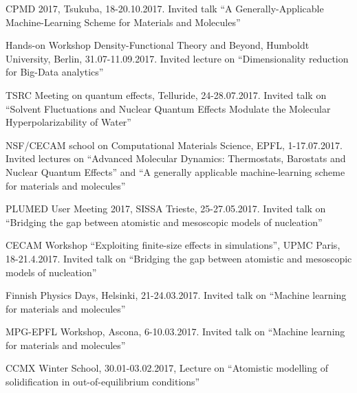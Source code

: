 \begin{enumerate}
{\item CPMD 2017, Tsukuba, 18-20.10.2017. Invited talk “A Generally-Applicable Machine-Learning Scheme for Materials and Molecules”
\item Hands-on Workshop Density-Functional Theory and Beyond, Humboldt University, Berlin, 31.07-11.09.2017. Invited lecture on “Dimensionality reduction for Big-Data analytics”
\item TSRC Meeting on quantum effects, Telluride, 24-28.07.2017. Invited talk on “Solvent Fluctuations and Nuclear Quantum Effects Modulate the Molecular Hyperpolarizability of Water”
\item NSF/CECAM school on Computational Materials Science, EPFL, 1-17.07.2017. Invited lectures on “Advanced Molecular Dynamics: Thermostats, Barostats and Nuclear Quantum Effects” and “A generally applicable machine-learning scheme for materials and molecules”
\item PLUMED User Meeting 2017, SISSA Trieste, 25-27.05.2017. Invited talk on “Bridging the gap between atomistic and mesoscopic models of nucleation”
\item CECAM Workshop “Exploiting finite-size effects in simulations”, UPMC Paris, 18-21.4.2017. Invited talk on “Bridging the gap between atomistic and mesoscopic models of nucleation”
\item Finnish Physics Days, Helsinki, 21-24.03.2017. Invited talk on “Machine learning for materials and molecules”
\item MPG-EPFL Workshop, Ascona, 6-10.03.2017. Invited talk on “Machine learning for materials and molecules”
\item CCMX Winter School, 30.01-03.02.2017, Lecture on “Atomistic modelling of solidification in out-of-equilibrium conditions”
}
\end{enumerate}
